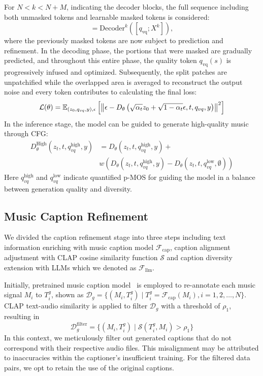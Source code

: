 For \(N < k < N + M \), indicating the decoder blocks, the full sequence including both unmasked tokens and learnable masked tokens is considered:
\begin{equation}
[q_\text{vq}^{k+1}; {X}^{k+1}] = \text{Decoder}^k \left(\left[q_\text{vq}; {X}^k\right]\right),
\end{equation}
where the previously masked tokens are now subject to prediction and refinement.
In the decoding phase, the portions that were masked are gradually predicted, and throughout this entire phase, the quality token \(q_\text{vq}(s)\) is progressively infused and optimized. Subsequently, the split patches are unpatchified while the overlapped area is averaged to reconstruct the output noise and every token contributes to calculating the final loss:
\begin{equation}
\small
\mathcal{L}(\theta) = \mathbb{E}_{(z_0,
q_{vq}, y),\epsilon} \left[ \left\|\epsilon - D_{\theta} \left( \sqrt{\alpha_t} z_0
+ \sqrt{1-\alpha_t} \epsilon, t, q_{vq}, {y} %
 \right) \right\|^2 \right]
\end{equation}
In the inference stage, the model can be guided to generate high-quality music through CFG: 
\begin{equation}
\begin{aligned}
D_{\theta}^{\text{High}}(z_t, t, q_{vq}^{\text{high}}, y) &= D_{\theta}(z_t, t, q_{vq}^{\text{high}}, y) + \\
& w\left(D_{\theta}(z_t, t, q_{vq}^{\text{high}}, y) - D_{\theta}(z_t, t, q_{vq}^{\text{low}}, \emptyset)\right)
\end{aligned}
\end{equation}
Here \(q_{vq}^\text{high}\) and \(q_{vq}^\text{low}\) indicate quantified p-MOS for guiding the model in a balance between generation quality and diversity.
\subsection{Music Caption Refinement}
\label{sec:audio_tokenization}
We divided the caption refinement stage into three steps including text information enriching with music caption model \(\mathcal{F}_\text{cap}\), caption alignment adjustment with CLAP cosine similarity function \(\mathcal{S}\) and caption diversity extension with LLMs which we denoted as \({\mathcal{F}}_{\text{llm}}\).

Initially, pretrained music caption model~\citep{doh2023lp} is employed to re-annotate each music signal $M_i$ to $T^{g}_i$,  shown as 
$
\mathcal{D}_{g} = \{(M_i, T^{g}_i) \mid T^{g}_i = \mathcal{F}_\text{cap}(M_i), i = 1, 2, \dots, N\}
$.
CLAP text-audio similarity is applied to filter \(\mathcal{D}_{g}\) with a threshold of \(\rho_1\), resulting in 
\begin{equation}
\mathcal{D}^{\text{filter}}_{g} = \{(M_i, T^{g}_i) \mid \mathcal{S}(T^{g}_i, M_i) > \rho_1\}
\end{equation}
In this context, we meticulously filter out generated captions that do not correspond with their respective audio files. This misalignment may be attributed to inaccuracies within the captioner's insufficient training. For the filtered data pairs, we opt to retain the use of the original captions.

